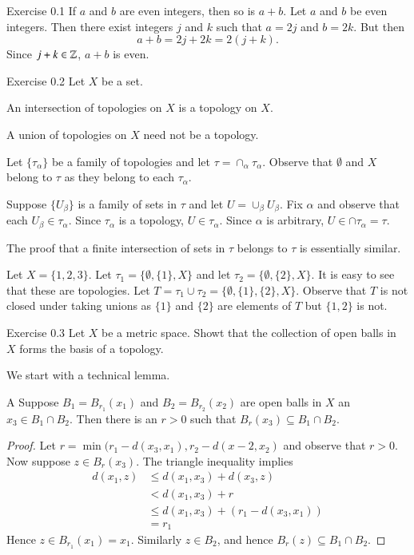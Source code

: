 \documentclass[minion]{homework651}
\begin{document}
\begin{problems}

\problem Exercise 0.1 
If $a$ and $b$ are even integers, then so is $a+b$.
\solution
Let $a$ and $b$ be even integers.  Then there exist integers
$j$ and $k$ such that $a=2j$ and $b=2k$.  But then
\begin{equation}
a+b = 2j+ 2k = 2(j+k).
\end{equation}
Since $j+k\in\mathbb Z$, $a+b$ is even.

\problem Exercise 0.2 
Let $X$ be a set.
\begin{subproblems}
\item An intersection of topologies on $X$ is a topology on $X$.
\item A union of topologies on $X$ need not be a topology.
\end{subproblems}
\subsol
Let $\{\tau_\alpha\}$ be a family of topologies and let $\tau=\cap_\alpha \tau_\alpha$.  
Observe that $\emptyset$ and $X$ belong to $\tau$ as they belong to each $\tau_\alpha$.

Suppose $\{U_\beta\}$ is a family of sets in $\tau$ and let $U=\cup_\beta U_\beta$. 
Fix $\alpha$ and observe that each $U_\beta\in \tau_\alpha$. Since $\tau_\alpha$
is a topology, $U\in\tau_\alpha$.  Since $\alpha$ is arbitrary, $U\in\cap\tau_\alpha=\tau$.

The proof that a finite intersection of sets in $\tau$ belongs to $\tau$ is essentially similar.

\subsol
Let $X=\{1,2,3\}$.  Let $\tau_1 = \{\emptyset, \{1\}, X\}$ and let $\tau_2 = \{\emptyset, \{2\}, X\}$.
It is easy to see that these are topologies.
Let $T=\tau_1\cup \tau_2 = \{\emptyset, \{1\}, \{2\}, X\}$.   Observe that $T$ is not closed under
taking unions as $\{1\}$ and $\{2\}$ are elements of $T$ but $\{1,2\}$ is not.

\problem Exercise 0.3 
Let $X$ be a metric space.  Showt that 
the collection of open balls in $X$ forms the basis of a topology.

\solution
We start with a technical lemma.
\begin{lemma}{A}\label{lem:DAMrefine}  
Suppose $B_1=B_{r_1}(x_1)$ and $B_2=B_{r_2}(x_2)$ are 
open balls in $X$ an $x_3\in B_1\cap B_2$.  Then there is an $r>0$ such
that $B_r(x_3)\subseteq B_1\cap B_2$.
\end{lemma}
\begin{proof}
Let $r = \min(r_1-d(x_3,x_1),r_2-d(x-2,x_2)$ and observe that $r>0$.  Now suppose
$z\in B_{r}(x_3)$.  The triangle inequality implies
\begin{align*} 
d(x_1,z)&\le d(x_1,x_3) + d(x_3,z) \\
&< d(x_1,x_3) + r \\
&\le d(x_1,x_3) + ( r_1-d(x_3,x_1) ) \\
&= r_1
\end{align*}
Hence $z\in B_{r_1}(x_1)=x_1$.  Similarly $z\in B_2$, and hence $B_r(z)\subseteq B_1\cap B_2$.
\end{proof}


\end{problems}
\end{document}
